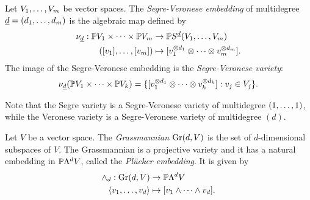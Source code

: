 \begin{definition}
\label{introduction-definition-SegreVeronese}
Let $V_1 , \ldots , V_m$ be vector spaces. The \emph{Segre-Veronese embedding} of multidegree $\underline{d} = (d_1 , \ldots , d_m)$ is the algebraic map defined by 
\begin{align*}
\nu_{\underline{d}} : \mathbb{P} V_1 \times \cdots \times \mathbb{P} V_m &\to \mathbb{P} S^{\underline{d}}(V_1,\ldots,V_m) \\
([v_1] , \ldots , [v_m]) &\mapsto [v_1^{\otimes d_1} \otimes \cdots \otimes v_m^{\otimes d_m}].
\end{align*}
The image of the Segre-Veronese embedding is the \emph{Segre-Veronese variety}:
\[
\nu_{\underline{d}}( \mathbb{P} V_1 \times \cdots \times \mathbb{P} V_k ) = \{ [v_1^{\otimes d_1} \otimes \cdots \otimes v_k^{\otimes d_k}] :  v_j \in V_j\}.
\]
\end{definition}
Note that the Segre variety is a Segre-Veronese variety of multidegree $(1 , \ldots , 1)$, while the Veronese variety is a Segre-Veronese variety of multidegree $(d)$.

\begin{definition}[Grassmannian]
\label{introduction-definition-Grassmannian}
    Let $V$ be a vector space. The \emph{Grassmannian} $\mathrm{Gr}(d,V)$ is the set of $d$-dimensional subspaces of $V$. The Grassmannian is a projective variety and it has a natural embedding in $\mathbb{P} \Lambda^d V$, called the \emph{Pl\"ucker embedding}. It is given by
    \begin{align*}
    \wedge_{d} : \mathrm{Gr}(d,V) &\to \mathbb{P} \Lambda^{d}V \\
    \langle v_1 , \ldots , v_d \rangle &\mapsto [v_1 \wedge \dots \wedge v_d].
    \end{align*}
\end{definition}    

